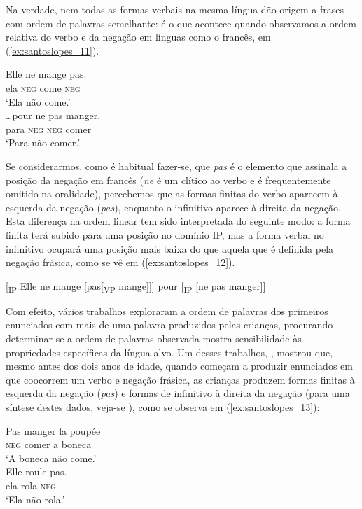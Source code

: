 \documentclass[output=paper]{LSP/langsci}
\begin{document}
Na verdade, nem todas as formas verbais na mesma língua dão origem a frases com ordem de palavras semelhante: é o que acontece quando observamos a ordem relativa do verbo e da negação em línguas como o francês, em (\ref{ex:santoslopes_11}).

\ea\label{ex:santoslopes_11}
\ea\label{ex:santoslopes_11a}
\gll Elle ne mange pas.\\
ela \textsc{neg} come \textsc{neg}\\
\glt `Ela não come.'\\
\ex\label{ex:santoslopes_11b}
\gll \ldots pour ne pas manger.\\
para \textsc{neg} \textsc{neg} comer\\
\glt `Para não comer.'
\zl

Se considerarmos, como é habitual fazer-se, que \textit{pas} é o elemento que assinala a posição da negação em francês (\textit{ne} é um clítico ao verbo e é frequentemente omitido na oralidade), percebemos que as formas finitas do verbo aparecem à esquerda da negação (\textit{pas}), enquanto o infinitivo aparece à direita da negação. Esta diferença na ordem linear tem sido interpretada do seguinte modo: a forma finita terá subido para uma posição no domínio IP, mas a forma verbal no infinitivo ocupará uma posição mais baixa do que aquela que é definida pela negação frásica, como se vê em (\ref{ex:santoslopes_12}).

\ea\label{ex:santoslopes_12}
\ea\label{ex:santoslopes_12a}
[\textsubscript{IP} Elle ne mange [pas[\textsubscript{VP} \sout{mange}]]]
\ex\label{ex:santoslopes_12b} pour [\textsubscript{IP} [ne pas manger]]
\zl

Com efeito, vários trabalhos exploraram a ordem de palavras dos primeiros enunciados com mais de uma palavra produzidos pelas crianças, procurando determinar se a ordem de palavras observada mostra sensibilidade às propriedades específicas da língua-alvo. Um desses trabalhos, \citet{pierce1992}, mostrou que, mesmo antes dos dois anos de idade, quando começam a produzir enunciados em que coocorrem um verbo e negação frásica, as crianças produzem formas finitas à esquerda da negação (\textit{pas}) e formas de infinitivo à direita da negação (para uma síntese destes dados, veja-se \citealt[109--111]{guasti2002}), como se observa em (\ref{ex:santoslopes_13}):

\ea\label{ex:santoslopes_13}
\ea\label{ex:santoslopes_13a}
\gll Pas manger la poupée\\
\textsc{neg} comer a boneca\\
\glt `A boneca não come.'\\
\ex\label{ex:santoslopes_13b}
\gll Elle roule pas.\\
ela rola \textsc{neg}\\
\glt `Ela não rola.'\\
\zl
\end{document}
